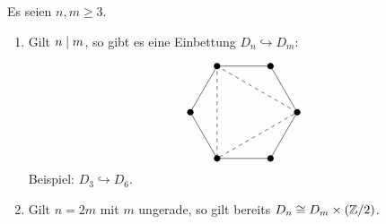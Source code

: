 \begin{proposition}
  Es seien $n, m \geq 3$.
  \begin{enumerate}
    \item
      Gilt $n \mathrel{|} m$, so gibt es eine Einbettung $D_n \hookrightarrow D_m$:
      \begin{center}
        \[
          \begin{tikzpicture}[scale=1.5]
            \draw (0:1)
            \foreach \x in {60, 120, ..., 360} {
              -- (\x:1)
            };
            \foreach \x in {60, 120, ..., 360} {
              \fill[black] (\x:1) circle (0.06);
            }
            \draw[dashed] (0:1)
            \foreach \x in {120, 240, 360} {
              -- (\x:1)
            };
          \end{tikzpicture}
        \]
        Beispiel: $D_3 \hookrightarrow D_6$.
      \end{center}
    \item
      Gilt $n = 2m$ mit $m$ ungerade, so gilt bereits $D_n \cong D_m \times (\mathbb{Z}/2)$.
  \end{enumerate}
\end{proposition}





